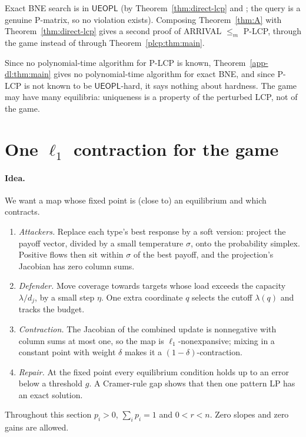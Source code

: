 \begin{corollary}\label{cor:direct-lcp}
\statusrefereed
Exact BNE search is in $\mathsf{UEOPL}$ (by Theorem~\ref{thm:direct-lcp} and \cite[Thm.~81]{fgms18}; the
query is a genuine P-matrix, so no violation exists). Composing Theorem~\ref{thm:A} with
Theorem~\ref{thm:direct-lcp} gives a second proof of ARRIVAL $\le_m$ P-LCP, through the game instead of through Theorem~\ref{plcp:thm:main}.
\end{corollary}

Since no polynomial-time algorithm for P-LCP is known,
Theorem~\ref{app-dl:thm:main} gives no polynomial-time algorithm for exact BNE, and since P-LCP is not
known to be $\mathsf{UEOPL}$-hard, it says nothing about hardness. The game may have many equilibria:
uniqueness is a property of the perturbed LCP, not of the game.

\section{One \texorpdfstring{$\ell_1$}{l1} contraction for the game}\label{sec:contraction}

\paragraph{Idea.} We want a map whose fixed point is (close to) an equilibrium and which contracts.
\begin{enumerate}[nosep]
\item \emph{Attackers.} Replace each type's best response by a soft version: project the payoff vector,
divided by a small temperature $\sigma$, onto the probability simplex. Positive flows then sit within
$\sigma$ of the best payoff, and the projection's Jacobian has zero column sums.
\item \emph{Defender.} Move coverage towards targets whose load exceeds the capacity
$\lambda/d_j$, by a small step $\eta$. One extra coordinate $q$ selects the cutoff $\lambda(q)$ and
tracks the budget.
\item \emph{Contraction.} The Jacobian of the combined update is nonnegative with column sums at most
one, so the map is $\ell_1$-nonexpansive; mixing in a constant point with weight $\delta$ makes it a
$(1-\delta)$-contraction.
\item \emph{Repair.} At the fixed point every equilibrium condition holds up to an error below a
threshold $g$. A Cramer-rule gap shows that then one pattern LP has an exact solution.
\end{enumerate}
Throughout this section $p_i>0$, $\sum_ip_i=1$ and $0<r<n$. Zero slopes and zero gains are allowed.

